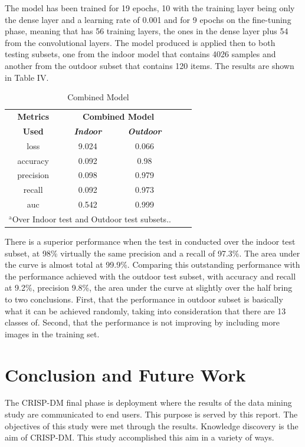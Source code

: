 \documentclass[conference]{IEEEtran}
\begin{document}
The model has been trained for 19 epochs, 10 with the training layer being only the dense layer and a learning rate of 0.001 and for 9 epochs on the fine-tuning phase, meaning that has 56 training layers, the ones in the dense layer plus 54 from the convolutional layers. The model produced is applied then to both testing subsets, one from the indoor model that contains 4026 samples and another from the outdoor subset  that contains 120 items. The results are shown in Table IV.
\begin{table}[htbp]
\caption{Combined Model}
\begin{center}
\begin{tabular}{|c|c|c|c|c|}
\hline
\textbf{Metrics}&\multicolumn{2}{|c|}{\textbf{Combined Model}} \\
\cline{2-3} 
\textbf{Used} & \textbf{\textit{Indoor}}& \textbf{\textit{Outdoor}} \\
\hline
loss  &9.024 &0.066   \\
\hline
accuracy  &0.092 &0.98  \\
\hline
precision  &0.098 &0.979  \\
\hline
recall  &0.092 &0.973  \\
\hline
auc  &0.542 &0.999   \\
\hline
\multicolumn{3}{l}{$^{\mathrm{a}}$Over Indoor test and Outdoor test subsets..}
\end{tabular}
\label{tab1}
\end{center}
\end{table}

There is a superior performance when the test in conducted over the indoor test subset, at 98\% virtually the same precision and a recall of 97.3\%. The area under the curve is almost total at 99.9\%. Comparing this outstanding performance with the performance achieved with the outdoor test subset, with accuracy and recall at 9.2\%, precision 9.8\%, the area under the curve at slightly over the half bring to two conclusions. First, that the performance in outdoor subset is basically what it can be achieved randomly, taking into consideration that there are 13 classes of. Second, that the performance is not improving by including more images in the training set. 

\section{Conclusion and Future Work}
The CRISP-DM final phase is deployment where the results of the data mining study are communicated to end users. This purpose is served by this report. The objectives of this study were met through the results. Knowledge discovery is the aim of CRISP-DM. This study accomplished this aim in a variety of ways. 
\end{document}
